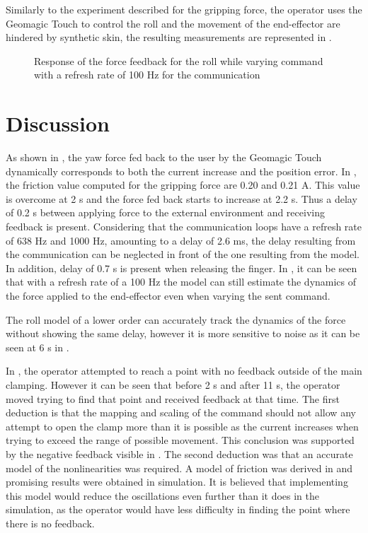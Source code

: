 Similarly to the experiment described for the gripping force, the operator uses the Geomagic Touch to control the roll and the movement of the end-effector are hindered by synthetic skin, the resulting measurements are represented in .
\begin{figure}[H]
  
  \caption{Response of the force feedback for the roll while varying command with a refresh rate of 100 Hz for the communication}
  \label{fig:fbkm_roll_100}
\end{figure}




\section{Discussion}


As shown in , the yaw force fed back to the user by the Geomagic Touch dynamically corresponds to both the current increase and the position error. In , the friction value computed for the gripping force are 0.20 and 0.21 A. This value is overcome at 2 s and the force fed back starts to increase at 2.2 s. Thus a delay of 0.2 s between applying force to the external environment and receiving feedback is present. Considering that the communication loops have a refresh rate of 638 Hz and 1000 Hz, amounting to a delay of 2.6 ms, the delay resulting from the communication can be neglected in front of the one resulting from the model. In addition, delay of 0.7 s is present when releasing the finger.
In , it can be seen that with a refresh rate of a 100 Hz the model can still estimate the dynamics of the force applied to the end-effector even when varying the sent command.

The roll model of a lower order can accurately track the dynamics of the force without showing the same delay, however it is more sensitive to noise as it can be seen at 6 s in .


In , the operator attempted to reach a point with no feedback outside of the main clamping. However it can be seen that before 2 s and after 11 s, the operator moved trying to find that point and received feedback at that time. The first deduction is that the mapping and scaling of the command should not allow any attempt to open the clamp more than it is possible as the current increases when trying to exceed the range of possible movement. This conclusion was supported by the negative feedback visible in . The second deduction was that an accurate model of the nonlinearities was required. A model of friction was derived in  and promising results were obtained in simulation. It is believed that implementing this model would reduce the oscillations even further than it does in the simulation, as the operator would have less difficulty in finding the point where there is no feedback.

